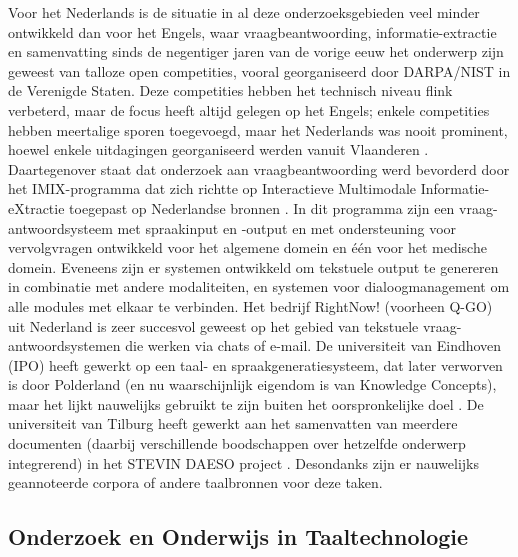\documentclass[]{../../metanetpaper}
\begin{document}
\begin{multicols}{2}

    Voor het Nederlands is de situatie in al deze onderzoeksgebieden veel minder ontwikkeld dan voor het Engels, waar vraagbeantwoording, informatie-extractie en samenvatting sinds de negentiger jaren van de vorige eeuw het onderwerp zijn geweest van talloze open competities, vooral georganiseerd door DARPA/NIST in de Verenigde Staten. Deze competities hebben het technisch niveau flink verbeterd, maar de focus heeft altijd gelegen op het Engels; enkele competities hebben meertalige sporen toegevoegd, maar het Nederlands was nooit prominent, hoewel enkele uitdagingen georganiseerd werden vanuit Vlaanderen \cite{SemEval}.  Daartegenover staat dat onderzoek aan vraagbeantwoording werd bevorderd door het IMIX-programma dat zich richtte op Interactieve Multimodale Informatie-eXtractie toegepast op Nederlandse bronnen \cite{IMIX}.  In dit programma zijn een vraag-antwoordsysteem met spraakinput en -output en met ondersteuning voor vervolgvragen ontwikkeld voor het algemene domein en {\'e}{\'e}n voor het medische domein. Eveneens zijn er systemen ontwikkeld om tekstuele output te genereren in combinatie met andere modaliteiten, en systemen voor dialoogmanagement om alle modules met elkaar te verbinden. Het bedrijf RightNow! (voorheen Q-GO) uit Nederland is zeer succesvol geweest op het gebied van tekstuele vraag-antwoordsystemen die werken via chats of e-mail. De universiteit van Eindhoven (IPO) heeft gewerkt op een taal- en spraakgeneratiesysteem, dat later verworven is door Polderland (en nu waarschijnlijk eigendom is van Knowledge Concepts), maar het lijkt nauwelijks gebruikt te zijn buiten het oorspronkelijke doel \cite{Theune:2003}.  De universiteit van Tilburg heeft gewerkt aan het samenvatten van meerdere documenten (daarbij verschillende boodschappen over hetzelfde onderwerp integrerend) in het STEVIN DAESO project \cite{DAESO}.  Desondanks zijn er nauwelijks geannoteerde corpora of andere taalbronnen voor deze taken.

\subsection{Onderzoek en Onderwijs in Taaltechnologie}


\end{multicols}
\end{document}
